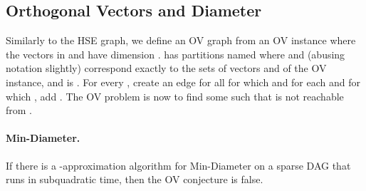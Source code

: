 \subsection{Orthogonal Vectors and Diameter}
Similarly to the HSE graph, we define an OV graph  from an OV instance  where the vectors in  and  have dimension .  has partitions named  where  and  (abusing notation slightly) correspond exactly to the sets of vectors  and  of the OV instance, and  is . For every , create an edge  for all  for which  and for each  and  for which , add . The OV problem is now to find some  such that  is not reachable from .


\paragraph{Min-Diameter.}
\begin{lemma}
\label{lem:MinDiamDAG}
If there is a -approximation algorithm for Min-Diameter on a sparse DAG that runs in subquadratic time, then the OV conjecture is false.
\end{lemma}
